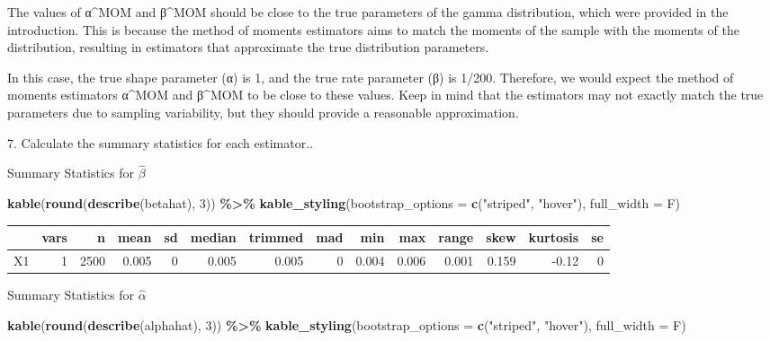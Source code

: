 \documentclass[
]{article}
\newenvironment{Shaded}{\begin{snugshade}}{\end{snugshade}}
\newcommand{\AttributeTok}[1]{\textcolor[rgb]{0.13,0.29,0.53}{#1}}
\newcommand{\DecValTok}[1]{\textcolor[rgb]{0.00,0.00,0.81}{#1}}
\newcommand{\FunctionTok}[1]{\textcolor[rgb]{0.13,0.29,0.53}{\textbf{#1}}}
\newcommand{\NormalTok}[1]{#1}
\newcommand{\SpecialCharTok}[1]{\textcolor[rgb]{0.81,0.36,0.00}{\textbf{#1}}}
\newcommand{\StringTok}[1]{\textcolor[rgb]{0.31,0.60,0.02}{#1}}
\begin{document}
The values of α\^{}MOM and β\^{}MOM should be close to the true
parameters of the gamma distribution, which were provided in the
introduction. This is because the method of moments estimators aims to
match the moments of the sample with the moments of the distribution,
resulting in estimators that approximate the true distribution
parameters.

In this case, the true shape parameter (α) is 1, and the true rate
parameter (β) is 1/200. Therefore, we would expect the method of moments
estimators α\^{}MOM and β\^{}MOM to be close to these values. Keep in
mind that the estimators may not exactly match the true parameters due
to sampling variability, but they should provide a reasonable
approximation.

{ 7. Calculate the summary statistics for each estimator.}.

Summary Statistics for \(\hat{\beta}\)

\begin{Shaded}
\begin{Highlighting}[]
\FunctionTok{kable}\NormalTok{(}\FunctionTok{round}\NormalTok{(}\FunctionTok{describe}\NormalTok{(betahat), }\DecValTok{3}\NormalTok{)) }\SpecialCharTok{\%\textgreater{}\%}
  \FunctionTok{kable\_styling}\NormalTok{(}\AttributeTok{bootstrap\_options =} \FunctionTok{c}\NormalTok{(}\StringTok{"striped"}\NormalTok{, }\StringTok{"hover"}\NormalTok{), }\AttributeTok{full\_width =}\NormalTok{ F)}
\end{Highlighting}
\end{Shaded}

\begin{table}
\centering
\begin{tabular}{l|r|r|r|r|r|r|r|r|r|r|r|r|r}
\hline
  & vars & n & mean & sd & median & trimmed & mad & min & max & range & skew & kurtosis & se\\
\hline
X1 & 1 & 2500 & 0.005 & 0 & 0.005 & 0.005 & 0 & 0.004 & 0.006 & 0.001 & 0.159 & -0.12 & 0\\
\hline
\end{tabular}
\end{table}

Summary Statistics for \(\hat{\alpha}\)

\begin{Shaded}
\begin{Highlighting}[]
\FunctionTok{kable}\NormalTok{(}\FunctionTok{round}\NormalTok{(}\FunctionTok{describe}\NormalTok{(alphahat), }\DecValTok{3}\NormalTok{)) }\SpecialCharTok{\%\textgreater{}\%}
  \FunctionTok{kable\_styling}\NormalTok{(}\AttributeTok{bootstrap\_options =} \FunctionTok{c}\NormalTok{(}\StringTok{"striped"}\NormalTok{, }\StringTok{"hover"}\NormalTok{), }\AttributeTok{full\_width =}\NormalTok{ F)}
\end{Highlighting}
\end{Shaded}
\end{document}
